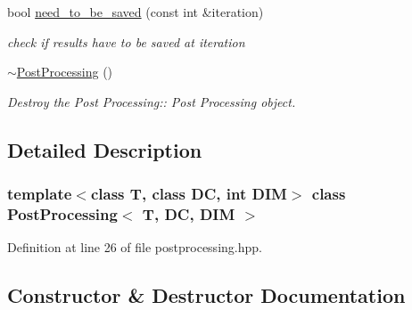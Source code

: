\begin{DoxyCompactItemize}
bool \hyperlink{classPostProcessing_ad8a8e567536f9ac9a891d86abe202efe}{need\+\_\+to\+\_\+be\+\_\+saved} (const int \&iteration)
\begin{DoxyCompactList}\small\item\em check if results have to be saved at iteration \end{DoxyCompactList}\item 
\mbox{\label{classPostProcessing_abe60f0da8bdd9d606e546dee22114f3c}} 
\hyperlink{classPostProcessing_abe60f0da8bdd9d606e546dee22114f3c}{$\sim$\+Post\+Processing} ()
\begin{DoxyCompactList}\small\item\em Destroy the Post Processing\+:\+: Post Processing object. \end{DoxyCompactList}\end{DoxyCompactItemize}


\subsection{Detailed Description}
\subsubsection*{template$<$class T, class DC, int D\+IM$>$\newline
class Post\+Processing$<$ T, D\+C, D\+I\+M $>$}



Definition at line 26 of file postprocessing.\+hpp.



\subsection{Constructor \& Destructor Documentation}
\mbox{\label{classPostProcessing_a1a7d26c5723dd72ed8fc84eb9e6c6d96}} 

